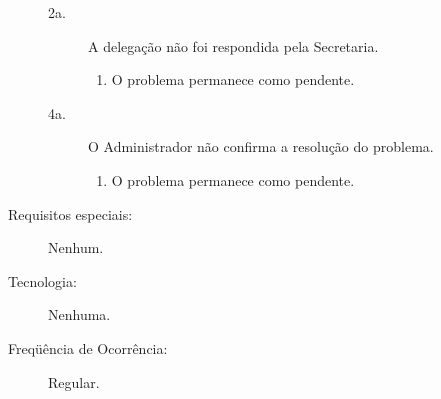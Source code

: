\documentclass[brazil,times]{abnt}
\begin{document}
\begin{description}
\begin{description}
	\item[2a.] A delegação não foi respondida pela Secretaria.
	\begin{enumerate}
 		\item O problema permanece como pendente.
	\end{enumerate}
		
	\item[4a.] O Administrador não confirma a resolução do problema. 
	\begin{enumerate}
 		\item O problema permanece como pendente.
	\end{enumerate} 
\end{description}
\item[Requisitos especiais:] Nenhum.
\item[Tecnologia:] Nenhuma.
\item[Freqüência de Ocorrência:] Regular.
\end{description}
\end{document}

